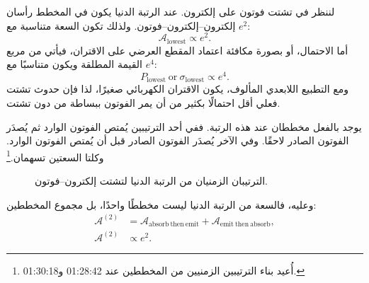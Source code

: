 \begin{classroomqa}
\end{classroomqa}

لننظر في تشتت فوتون على إلكترون. عند الرتبة الدنيا يكون في المخطط رأسان إلكترون--إلكترون--فوتون. ولذلك تكون السعة متناسبة مع \(e^2\):
\begin{equation}
\mathcal{A}_{\mathrm{lowest}}\propto e^2.
\end{equation}
أما الاحتمال، أو بصورة مكافئة اعتماد المقطع العرضي على الاقتران، فيأتي من مربع القيمة المطلقة ويكون متناسبًا مع \(e^4\):
\begin{equation}
P_{\mathrm{lowest}}\ \text{or}\ \sigma_{\mathrm{lowest}}
\propto e^4.
\end{equation}
ومع التطبيع اللابعدي المألوف، يكون الاقتران الكهربائي صغيرًا، لذا فإن حدوث تشتت فعلي أقل احتمالًا بكثير من أن يمر الفوتون ببساطة من دون تشتت.

يوجد بالفعل مخططان عند هذه الرتبة. ففي أحد الترتيبين يُمتص الفوتون الوارد ثم يُصدَر الفوتون الصادر لاحقًا. وفي الآخر يُصدَر الفوتون الصادر قبل أن يُمتص الفوتون الوارد. وكلتا السعتين تسهمان.\footnote{أُعيد بناء الترتيبين الزمنيين من المخططين عند 01:28:42 و01:30:18.}

\begin{figure}[htbp]
\centering
{}
\caption{الترتيبان الزمنيان من الرتبة الدنيا لتشتت إلكترون--فوتون.}
\end{figure}

وعليه، فالسعة من الرتبة الدنيا ليست مخططًا واحدًا، بل مجموع المخططين:
\begin{equation}
\begin{aligned}
\mathcal{A}^{(2)}
&=
\mathcal{A}_{\mathrm{absorb\ then\ emit}}
+\mathcal{A}_{\mathrm{emit\ then\ absorb}},\\
\mathcal{A}^{(2)}&\propto e^2.
\end{aligned}
\end{equation}

